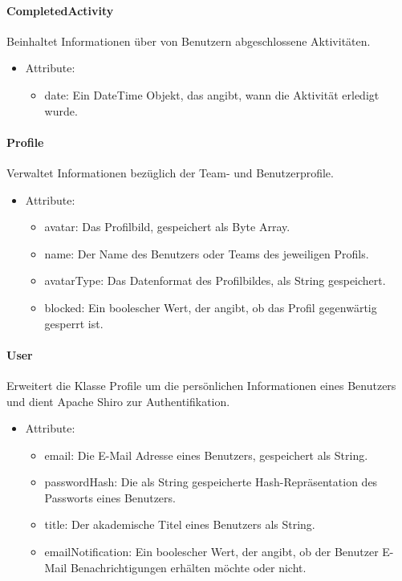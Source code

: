	\paragraph{CompletedActivity}Beinhaltet Informationen \"uber von Benutzern abgeschlossene Aktivit\"aten.
		\begin{itemize}
			\item Attribute:
			\begin{itemize}
				\item date: Ein DateTime Objekt, das angibt, wann die Aktivit\"at erledigt wurde.
			\end{itemize}
		\end{itemize}
	\paragraph{Profile}Verwaltet Informationen bez\"uglich der Team- und Benutzerprofile.
		\begin{itemize}
			\item Attribute:
			\begin{itemize}
				\item avatar: Das Profilbild, gespeichert als Byte Array.
				\item name: Der Name des Benutzers oder Teams des jeweiligen Profils.
				\item avatarType: Das Datenformat des Profilbildes, als String gespeichert.
				\item blocked: Ein boolescher Wert, der angibt, ob das Profil gegenw\"artig gesperrt ist.
			\end{itemize}
		\end{itemize}
	\paragraph{User}Erweitert die Klasse Profile um die pers\"onlichen Informationen eines Benutzers und dient Apache Shiro zur Authentifikation.
		\begin{itemize}
			\item Attribute:
			\begin{itemize}
				\item email: Die E-Mail Adresse eines Benutzers, gespeichert als String.
				\item passwordHash: Die als String gespeicherte Hash-Repr\"asentation des Passworts eines Benutzers.
				\item title: Der akademische Titel eines Benutzers als String.
				\item emailNotification: Ein boolescher Wert, der angibt, ob der Benutzer E-Mail Benachrichtigungen erh\"alten m\"ochte oder nicht.
			\end{itemize}
		\end{itemize}
